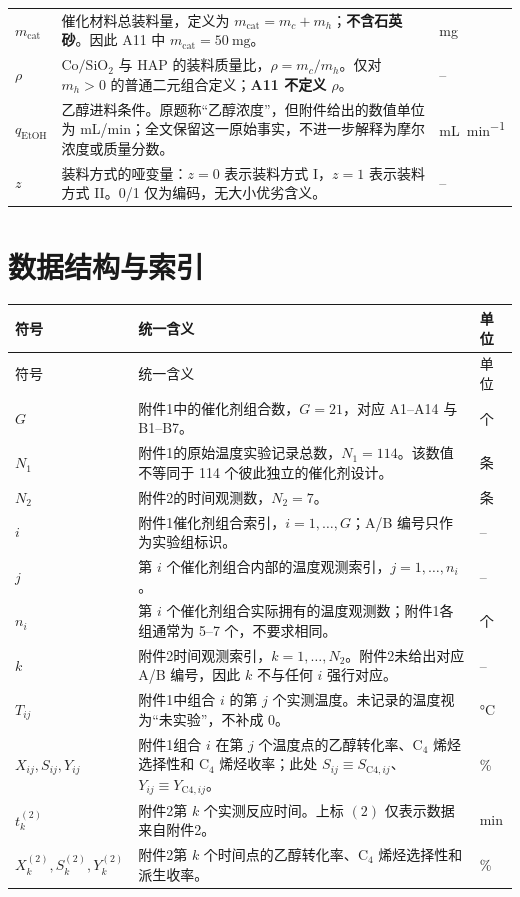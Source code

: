\documentclass[UTF8,zihao=-4,a4paper,fontset=none]{ctexart}
\begin{document}
\begin{longtable}{C{0.18\textwidth} L{0.52\textwidth} C{0.14\textwidth}}
$m_{\mathrm{cat}}$ & 催化材料总装料量，定义为 $m_{\mathrm{cat}}=m_c+m_h$；\textbf{不含石英砂}。因此 A11 中 $m_{\mathrm{cat}}=\SI{50}{\milli\gram}$。 & \si{\milli\gram} \\
$\rho$ & $\mathrm{Co/SiO_2}$ 与 HAP 的装料质量比，$\rho=m_c/m_h$。仅对 $m_h>0$ 的普通二元组合定义；\textbf{A11 不定义 $\rho$}。 & -- \\
$q_{\mathrm{EtOH}}$ & 乙醇进料条件。原题称“乙醇浓度”，但附件给出的数值单位为 mL/min；全文保留这一原始事实，不进一步解释为摩尔浓度或质量分数。 & \si{\milli\liter\per\minute} \\
$z$ & 装料方式的哑变量：$z=0$ 表示装料方式 I，$z=1$ 表示装料方式 II。0/1 仅为编码，无大小优劣含义。 & -- \\
\bottomrule
\end{longtable}

\section{数据结构与索引}

\begin{longtable}{C{0.18\textwidth} L{0.52\textwidth} C{0.14\textwidth}}
\toprule
符号 & 统一含义 & 单位 \\
\midrule
\endfirsthead
\toprule
符号 & 统一含义 & 单位 \\
\midrule
\endhead
$G$ & 附件1中的催化剂组合数，$G=21$，对应 A1--A14 与 B1--B7。 & 个 \\
$N_1$ & 附件1的原始温度实验记录总数，$N_1=114$。该数值不等同于 114 个彼此独立的催化剂设计。 & 条 \\
$N_2$ & 附件2的时间观测数，$N_2=7$。 & 条 \\
$i$ & 附件1催化剂组合索引，$i=1,\ldots,G$；A/B 编号只作为实验组标识。 & -- \\
$j$ & 第 $i$ 个催化剂组合内部的温度观测索引，$j=1,\ldots,n_i$。 & -- \\
$n_i$ & 第 $i$ 个催化剂组合实际拥有的温度观测数；附件1各组通常为 5--7 个，不要求相同。 & 个 \\
$k$ & 附件2时间观测索引，$k=1,\ldots,N_2$。附件2未给出对应 A/B 编号，因此 $k$ 不与任何 $i$ 强行对应。 & -- \\
$T_{ij}$ & 附件1中组合 $i$ 的第 $j$ 个实测温度。未记录的温度视为“未实验”，不补成 0。 & \si{\degreeCelsius} \\
$X_{ij},S_{ij},Y_{ij}$ & 附件1组合 $i$ 在第 $j$ 个温度点的乙醇转化率、$\mathrm{C}_4$ 烯烃选择性和 $\mathrm{C}_4$ 烯烃收率；此处 $S_{ij}\equiv S_{\mathrm{C4},ij}$、$Y_{ij}\equiv Y_{\mathrm{C4},ij}$。 & \% \\
$t_k^{(2)}$ & 附件2第 $k$ 个实测反应时间。上标 $(2)$ 仅表示数据来自附件2。 & \si{\minute} \\
$X_k^{(2)},S_k^{(2)},Y_k^{(2)}$ & 附件2第 $k$ 个时间点的乙醇转化率、$\mathrm{C}_4$ 烯烃选择性和派生收率。 & \% \\
\bottomrule
\end{longtable}
\end{document}
